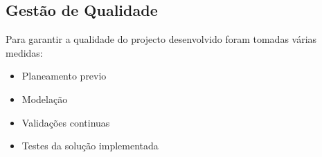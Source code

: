 \subsection*{Gestão de Qualidade}
Para garantir a qualidade do projecto desenvolvido foram tomadas várias medidas:
\begin{itemize}
    \item Planeamento previo
    \item Modelação
    \item Validações continuas
    \item Testes da solução implementada
\end{itemize}
